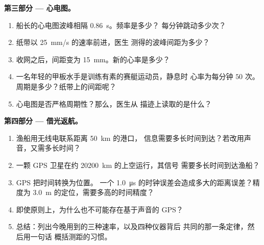 \begin{problem}[{周末问题 --- 读懂世界的信号：一条
定律，$d = v\,t$，用来测定风暴距离、绘制海床、计数心跳，并
探究 GPS 的工作原理}]
\medskip
\noindent\textbf{第三部分 --- 心电图。}
\begin{enumerate}[resume]
  \item 船长的心电图波峰相隔 \qty{0.86}{s}。频率是多少？
        每分钟跳动多少次？
  \item 纸带以 \qty{25}{mm/s} 的速率前进，医生
        测得的波峰间距为多少？
  \item 收网之后，间距变为 \qty{15}{mm}。新的心率是多少？
  \item 一名年轻的甲板水手是训练有素的赛艇运动员，静息时
        心率为每分钟 $50$ 次。周期是多少？纸带上的间距呢？
  \item 心电图是否严格周期性？那么，医生从
        描迹上读取的是什么？
\end{enumerate}

\medskip
\noindent\textbf{第四部分 --- 借光返航。}
\begin{enumerate}[resume]
  \item 渔船用无线电联系距离 \qty{50}{km} 的港口，
        信息需要多长时间到达？若改用声音，又需多长时间？
  \item 一颗 GPS 卫星在约 \qty{20200}{km} 的上空运行，其信号
        需要多长时间到达渔船？
  \item GPS 把时间转换为位置。
        一个 \qty{1.0}{\micro s} 的时钟误差会造成多大的距离误差？精度为
        \qty{3.0}{m} 的定位，需要多高的时间精度？
  \item 即使原则上，为什么也不可能存在基于声音的 GPS？
  \item 总结：列出今晚用到的三种速率，以及四种仪器背后
        共同的那一条定律，然后用一句话
        概括测距的习惯。
\end{enumerate}
\end{problem}

